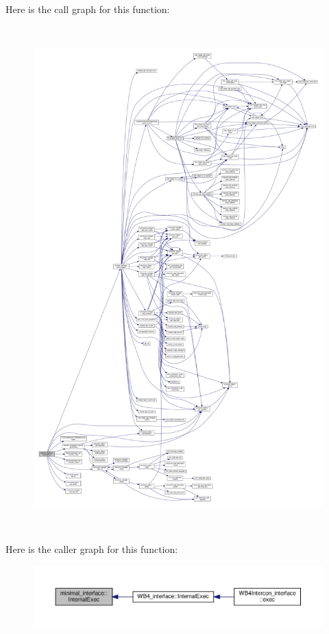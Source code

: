 Here is the call graph for this function\+:
\nopagebreak
\begin{figure}[H]
\begin{center}
\leavevmode
\includegraphics[height=550pt]{dc/da7/classminimal__interface_a38ab4c7e28f6f8c7dd9cd98989b8bddf_cgraph}
\end{center}
\end{figure}
Here is the caller graph for this function\+:
\nopagebreak
\begin{figure}[H]
\begin{center}
\leavevmode
\includegraphics[width=350pt]{dc/da7/classminimal__interface_a38ab4c7e28f6f8c7dd9cd98989b8bddf_icgraph}
\end{center}
\end{figure}


